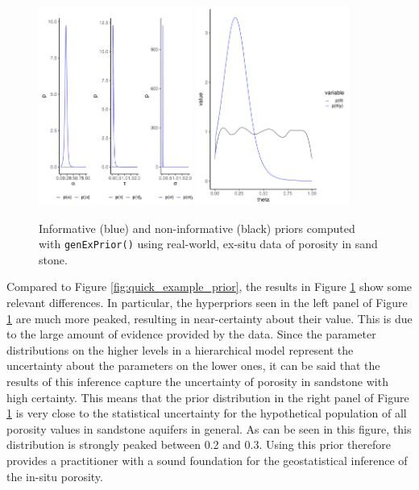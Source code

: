 \begin{figure}
    \centering
    \includegraphics[width=0.45\textwidth]{img/example_2_hyperDist.pdf}
    \includegraphics[width=0.45\textwidth]{img/example_2_exPrior.pdf}
    \caption{Informative (blue) and non-informative (black) priors computed with \texttt{genExPrior()} using real-world, ex-situ data of porosity in sand stone.}
    \label{fig:wwhypda_exprior}
\end{figure}

Compared to Figure \ref{fig:quick_example_prior}, the results in Figure \ref{fig:wwhypda_exprior} show some relevant differences. 
In particular, the hyperpriors seen in the left panel of Figure \ref{fig:wwhypda_exprior} are much more peaked, resulting in near-certainty about their value. 
This is due to the large amount of evidence provided by the data. 
Since the parameter distributions on the higher levels in a hierarchical model represent the uncertainty about the parameters on the lower ones, it can be said that the results of this inference capture the uncertainty of porosity in sandstone with high certainty. 
This means that the prior distribution in the right panel of Figure \ref{fig:wwhypda_exprior} is very close to the statistical uncertainty for the hypothetical population of all porosity values in sandstone aquifers in general. 
As can be seen in this figure, this distribution is strongly peaked between 0.2 and 0.3. 
Using this prior therefore provides a practitioner with a sound foundation for the geostatistical inference of the in-situ porosity. 


